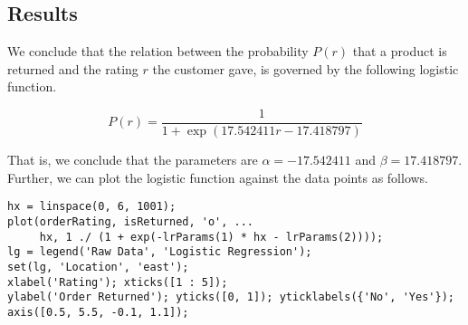 \subsection{Results}

We conclude that the relation between the probability $P(r)$ that a product is returned and the rating $r$ the customer gave, is governed by the following logistic function.

$$P(r) = \frac{1}{1 + \exp(17.542411 r - 17.418797)}$$

\noindent
That is, we conclude that the parameters are $\alpha = -17.542411$ and $\beta = 17.418797$. Further, we can plot the logistic function against the data points as follows.

\begin{lstlisting}
hx = linspace(0, 6, 1001);
plot(orderRating, isReturned, 'o', ...
     hx, 1 ./ (1 + exp(-lrParams(1) * hx - lrParams(2))));
lg = legend('Raw Data', 'Logistic Regression');
set(lg, 'Location', 'east');
xlabel('Rating'); xticks([1 : 5]);
ylabel('Order Returned'); yticks([0, 1]); yticklabels({'No', 'Yes'});
axis([0.5, 5.5, -0.1, 1.1]);
\end{lstlisting}


